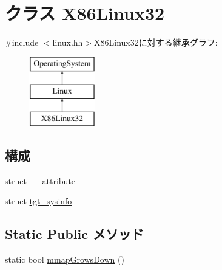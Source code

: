 \hypertarget{classX86Linux32}{
\section{クラス X86Linux32}
\label{classX86Linux32}
}


{\ttfamily \#include $<$linux.hh$>$}X86Linux32に対する継承グラフ:\begin{figure}[H]
\begin{center}
\leavevmode
\includegraphics[height=3cm]{classX86Linux32}
\end{center}
\end{figure}
\subsection*{構成}
\begin{DoxyCompactItemize}
\item 
struct \hyperlink{structX86Linux32_1_1____attribute____}{\_\-\_\-attribute\_\-\_\-}
\item 
struct \hyperlink{structX86Linux32_1_1tgt__sysinfo}{tgt\_\-sysinfo}
\end{DoxyCompactItemize}
\subsection*{Static Public メソッド}
\begin{DoxyCompactItemize}
\item 
static bool \hyperlink{classX86Linux32_ac6a940551fe72dce1ba4e7b4fa093137}{mmapGrowsDown} ()
\end{DoxyCompactItemize}
